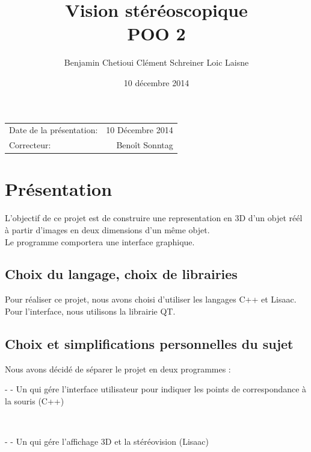 \documentclass{article}
\title{Vision stéréoscopique \\ POO 2}
\date{10 décembre 2014}
\author{Benjamin Chetioui   Clément Schreiner   Loic Laisne}
\begin{document}
\maketitle

\begin{center}
\begin{tabular}{l r}
Date de la présentation: & 10 Décembre 2014 \\ 
Correcteur: & Benoît Sonntag 
\end{tabular}
\end{center}

\section{Présentation}

L’objectif de ce projet est de construire une representation en 3D d’un objet réél à partir d'images en deux dimensions d’un même objet.\\
Le programme comportera une interface graphique.


\subsection{Choix du langage, choix de librairies}
Pour réaliser ce projet, nous avons choisi d'utiliser les langages C++ et Lisaac.\\
Pour l'interface, nous utilisons la librairie QT.
 
\subsection{Choix et simplifications personnelles du sujet}

 Nous avons décidé de séparer le projet en deux programmes : \\
 \begin{tabular} - - Un qui gére l'interface utilisateur pour indiquer les points de correspondance à la souris (C++) \end{tabular}\\
 \begin{tabular} - - Un qui gére l'affichage 3D et la stéréovision (Lisaac) \end{tabular}
 
\end{document}
